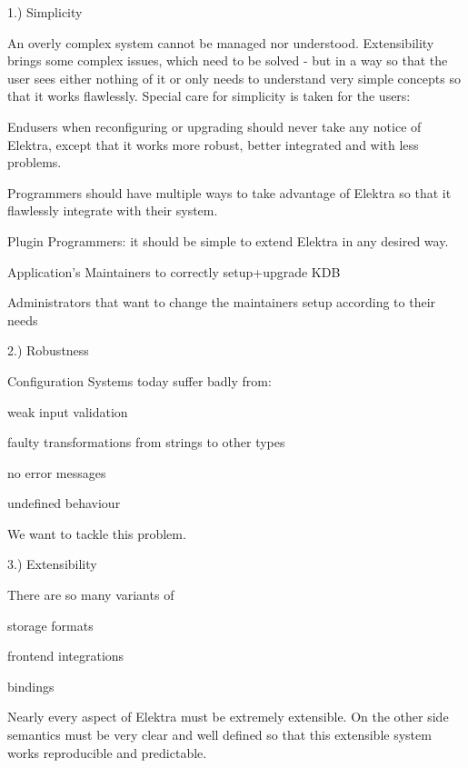 1.) Simplicity

An overly complex system cannot be managed nor understood. Extensibility brings some complex issues, which need to be solved -\/ but in a way so that the user sees either nothing of it or only needs to understand very simple concepts so that it works flawlessly. Special care for simplicity is taken for the users\+:


\begin{DoxyItemize}
\item Endusers when reconfiguring or upgrading should never take any notice of Elektra, except that it works more robust, better integrated and with less problems.
\item Programmers should have multiple ways to take advantage of Elektra so that it flawlessly integrate with their system.
\item Plugin Programmers\+: it should be simple to extend Elektra in any desired way.
\item Application's Maintainers to correctly setup+upgrade K\+D\+B
\item Administrators that want to change the maintainers setup according to their needs
\end{DoxyItemize}

2.) Robustness

Configuration Systems today suffer badly from\+:


\begin{DoxyItemize}
\item weak input validation
\item faulty transformations from strings to other types
\item no error messages
\item undefined behaviour
\end{DoxyItemize}

We want to tackle this problem.

3.) Extensibility

There are so many variants of


\begin{DoxyItemize}
\item storage formats
\item frontend integrations
\item bindings
\end{DoxyItemize}

Nearly every aspect of Elektra must be extremely extensible. On the other side semantics must be very clear and well defined so that this extensible system works reproducible and predictable.

